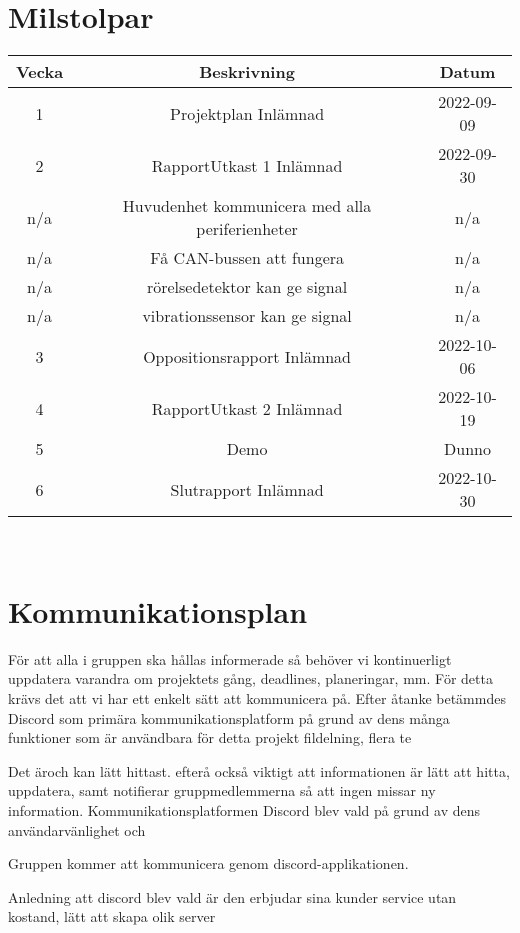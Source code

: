 \documentclass[a4paper]{article}
\begin{document}
\section{Milstolpar}
\begin{center}
     \begin{tabular}{|c|c|c|}
      \hline
      Vecka & Beskrivning & Datum \\
      \hline
      1 & Projektplan Inlämnad & 2022-09-09 \\
      \rowcolor{lightgray}
      2 & RapportUtkast 1 Inlämnad & 2022-09-30 \\
      n/a & Huvudenhet kommunicera med alla periferienheter & n/a \\
      \rowcolor{lightgray}
      n/a & Få CAN-bussen att fungera & n/a \\
      n/a & rörelsedetektor kan ge signal & n/a \\
      \rowcolor{lightgray}
      n/a & vibrationssensor kan ge signal & n/a \\
      3 & Oppositionsrapport Inlämnad & 2022-10-06 \\
      \rowcolor{lightgray}
      4 & RapportUtkast 2 Inlämnad & 2022-10-19 \\
      5 & Demo & Dunno \\
      \rowcolor{lightgray}
      6 & Slutrapport Inlämnad & 2022-10-30 \\
      \hline
 
     \end{tabular}
 \end{center}
\
\
\section{Kommunikationsplan}
För att alla i gruppen ska hållas informerade så behöver vi kontinuerligt uppdatera varandra om projektets gång, deadlines, planeringar, mm. För detta krävs det att vi har ett enkelt sätt att kommunicera på. Efter åtanke betämmdes Discord som primära kommunikationsplatform på grund av dens många funktioner som är användbara för detta projekt fildelning, flera te

Det äroch kan lätt hittast.  efterå också viktigt att informationen är lätt att hitta, uppdatera, samt notifierar gruppmedlemmerna så att ingen missar ny information. 
Kommunikationsplatformen Discord blev vald på grund av dens användarvänlighet och 

Gruppen kommer att kommunicera genom discord-applikationen.

Anledning att discord
blev vald är den erbjudar sina kunder service utan kostand, lätt att skapa olik server
\end{document}
